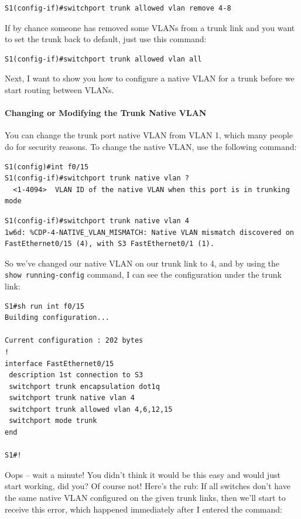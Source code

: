 \begin{verbatim}
S1(config-if)#switchport trunk allowed vlan remove 4-8
\end{verbatim}

If by chance someone has removed some VLANs from a trunk link and you
want to set the trunk back to default, just use this command:

\begin{verbatim}
S1(config-if)#switchport trunk allowed vlan all
\end{verbatim}

Next, I want to show you how to configure a native VLAN for a trunk
before we start routing between VLANs.

\paragraph{Changing or Modifying the Trunk Native VLAN}

You can change the trunk port native VLAN from VLAN 1, which many people
do for security reasons. To change the native VLAN, use the following
command:

\begin{verbatim}
S1(config)#int f0/15
S1(config-if)#switchport trunk native vlan ?
  <1-4094>  VLAN ID of the native VLAN when this port is in trunking mode
\end{verbatim}

\begin{verbatim}
S1(config-if)#switchport trunk native vlan 4
1w6d: %CDP-4-NATIVE_VLAN_MISMATCH: Native VLAN mismatch discovered on FastEthernet0/15 (4), with S3 FastEthernet0/1 (1).
\end{verbatim}

So we've changed our native VLAN on our trunk link to 4, and by using
the \texttt{show\ running-config} command, I can see the configuration
under the trunk link:

\begin{verbatim}
S1#sh run int f0/15
Building configuration...
 
Current configuration : 202 bytes
!
interface FastEthernet0/15
 description 1st connection to S3
 switchport trunk encapsulation dot1q
 switchport trunk native vlan 4
 switchport trunk allowed vlan 4,6,12,15
 switchport mode trunk
end
 
S1#!
\end{verbatim}

Oops -- wait a minute!
You didn't think it would be this easy and would just start working, did
you? Of course not! Here's the rub: If all switches don't have the same
native VLAN configured on the given trunk links, then we'll start to
receive this error, which happened immediately after I entered the
command:

